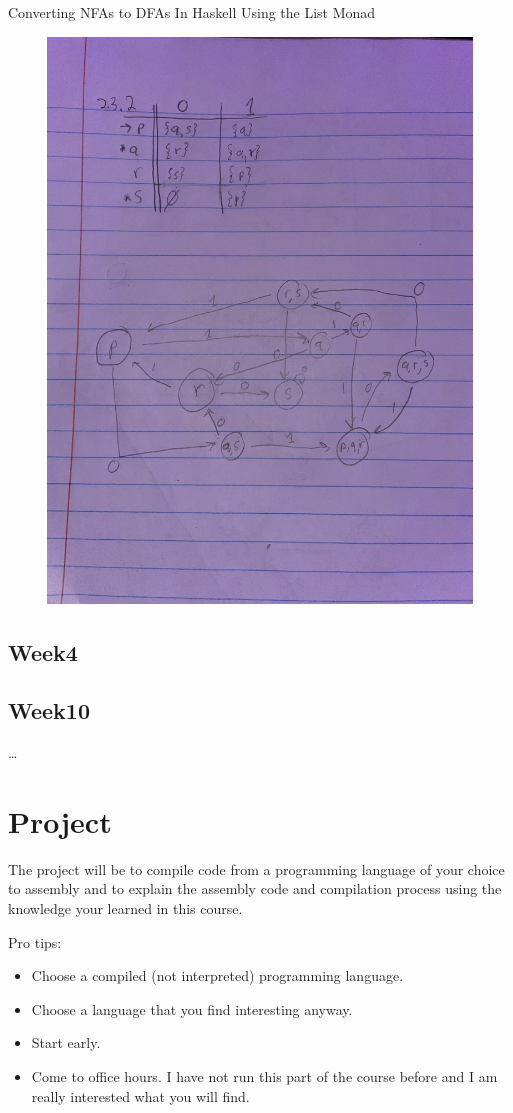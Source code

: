 \documentclass{article}
\theoremstyle{theorem}
\theoremstyle{definition}
\theoremstyle{remark}
\begin{document}
Converting NFAs to DFAs In Haskell Using the List Monad
\medskip\begin{center}
\includegraphics[width=15cm, height=15cm]{Week3P2.pdf}
\end{center}

\subsection{Week4}


\subsection{Week10}


\ldots
\section{Project}

The project will be to compile code from a programming language of your choice to assembly and to explain the assembly code and compilation process using the knowledge your learned in this course. 


\medskip\noindent
Pro tips:
\begin{itemize}
\item Choose a compiled (not interpreted) programming language.
\item Choose a language that you find interesting anyway.
\item Start early.
\item Come to office hours. I have not run this part of the course before and I am really interested what you will find.
\end{itemize}
 
\end{document}
